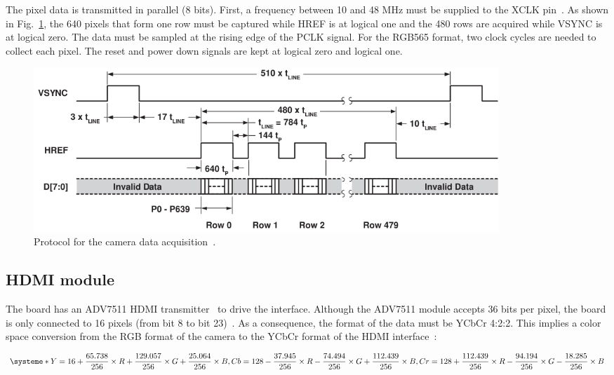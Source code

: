 The pixel data is transmitted in parallel (8 bits). First, a frequency between 10 and 48 MHz must be supplied to the XCLK pin~\cite{camera}. As shown in Fig.~\ref{fig:data_acquisition}, the 640 pixels that form one row must be captured while HREF is at logical one and the 480 rows are acquired while VSYNC is at logical zero. The data must be sampled at the rising edge of the PCLK signal. For the RGB565 format, two clock cycles are needed to collect each pixel. The reset and power down signals are kept at logical zero and logical one.

\begin{figure}[!htb]
  \centering
  \includegraphics[width=0.85\textwidth]{Figures/camera_data_acquisition.png}
  \caption{Protocol for the camera data acquisition~\cite{camera}.}
  \label{fig:data_acquisition}
\end{figure}

\vspace{-0.2cm}
\subsection{HDMI module}

The board has an ADV7511 HDMI transmitter~\cite{hdmi} to drive the interface. Although the ADV7511 module accepts 36 bits per pixel, the board is only connected to 16 pixels (from bit 8 to bit 23)~\cite{fpga}. As a consequence, the format of the data must be YCbCr 4:2:2. This implies a color space conversion from the RGB format of the camera to the YCbCr format of the HDMI interface~\cite{color_conversion}:

\begin{equation}
    \normalsize 
    \systeme*{ Y = 16 + \frac{65.738}{256} \times R + \frac{129.057}{256} \times G + \frac{25.064}{256} \times B, Cb = 128 - \frac{37.945}{256} \times R - \frac{74.494}{256} \times G + \frac{112.439}{256} \times B, Cr = 128 + \frac{112.439}{256} \times R - \frac{94.194}{256} \times G - \frac{18.285}{256} \times B}
\end{equation}
\vspace{+0.2cm}

